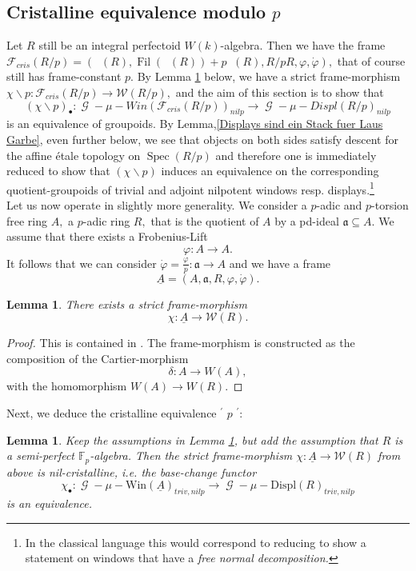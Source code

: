 \documentclass[a4paper,10,5 pt]{amsart}
\newtheorem{Lemma}[Satz]{Lemma}
\theoremstyle{definition}
\DeclareMathOperator{\Spec}{Spec}
\DeclareMathOperator{\Acris}{\mathbb{A}_{cris}}
\DeclareMathOperator{\Fil}{Fil}
\DeclareMathOperator{\G}{\mathcal{G}}
\begin{document}
\subsection{Cristalline equivalence modulo $p$}
Let $R$ still be an integral perfectoid $W(k)$-algebra. Then we have the frame $
\mathcal{F}_{cris}(R/p)=(\Acris(R), \Fil(\Acris(R))+p\Acris(R),R/pR,\varphi,\dot{\varphi}),
$
that of course still has frame-constant $p.$
By Lemma \ref{Framemorphismus von Acris nach W(R)} below,
we have a strict frame-morphism $\chi\backslash p\colon \mathcal{F}_{cris}(R/p)\rightarrow \mathcal{W}(R/p),$ and the aim of this section is to show that
$$
(\chi\backslash p)_{\bullet}\colon \G-\mu-Win(
\mathcal{F}_{cris}(R/p))_{nilp}\rightarrow \G-\mu-Displ(R/p)_{nilp}
$$
is an equivalence of groupoids. By Lemma,\ref{Displays sind ein Stack fuer Laus Garbe}, even further below, we see that objects on both sides satisfy descent for the affine étale topology on $\Spec(R/p)$ and therefore one is immediately reduced to show that $(\chi\backslash p)$ induces an equivalence on the corresponding quotient-groupoids of trivial and adjoint nilpotent windows resp. displays.\footnote{In the classical language this would correspond to reducing to show a statement on windows that have a \textit{free normal decomposition.}}
\\
Let us now operate in slightly more generality. We consider a $p$-adic and $p$-torsion free ring $A,$ a $p$-adic ring $R,$ that is the quotient of $A$ by a pd-ideal $\mathfrak{a}\subseteq A.$ We assume that there exists a Frobenius-Lift
$$
\varphi\colon A\rightarrow A.
$$ 
It follows that we can consider $\dot{\varphi}=\frac{\varphi}{p}\colon \mathfrak{a}\rightarrow A$ and we have a frame 
$$
\underline{A}=(A,\mathfrak{a},R,\varphi,\dot{\varphi}).
$$
\begin{Lemma}\label{Framemorphismus von Acris nach W(R)}
There exists a strict frame-morphism
$$
\chi\colon \underline{A}\rightarrow \mathcal{W}(R).
$$
\end{Lemma}
\begin{proof}
This is contained in \cite[Corollary 2.40.]{zink-vorlesung}. The frame-morphism is constructed as the composition of the Cartier-morphism
$$
\delta\colon A\rightarrow W(A),
$$
with the homomorphism $W(A)\rightarrow W(R).$
\end{proof}
Next, we deduce the cristalline equivalence $^{\prime}$ $p$ $^{\prime}$:
\begin{Lemma}\label{Kristalline aequivalenz modulo p}
Keep the assumptions in Lemma \ref{Framemorphismus von Acris nach W(R)}, but add the assumption that $R$ is a semi-perfect $\mathbb{F}_{p}$-algebra. Then the strict frame-morphism $\chi\colon \underline{A}\rightarrow \mathcal{W}(R)$ from above is nil-cristalline, i.e. the base-change functor 
$$\chi_{\bullet}\colon \G-\mu-\text{Win}(\underline{A})_{triv,nilp}\rightarrow \G-\mu-\text{Displ}(R)_{triv,nilp} $$
is an equivalence.
\end{Lemma}
\end{document}

